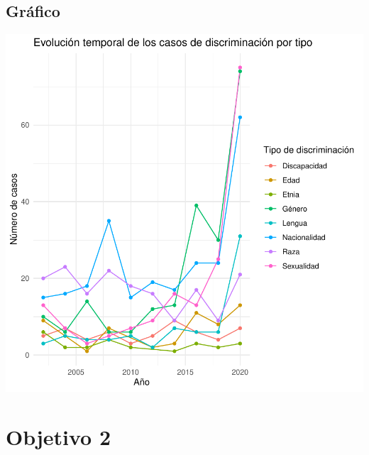 \documentclass{article}
\begin{document}
\subsection{Gráfico}
\includegraphics{Informetecnico-002}


\section*{Objetivo 2}
\end{document}
